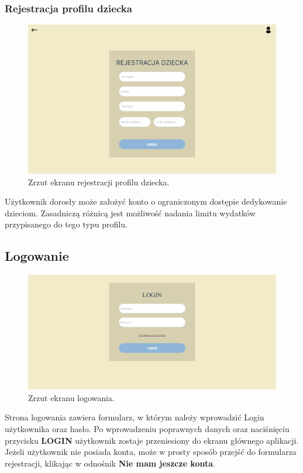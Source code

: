 \documentclass[12pt,a4paper,oneside]{article}
\begin{document}
\subsubsection{Rejestracja profilu dziecka}
\begin{figure}[H]
    \centering
    \includegraphics[width=\hsize,keepaspectratio]{images/register_childs_profile.png}
    \caption{Zrzut ekranu rejestracji profilu dziecka.}
\end{figure}
Użytkownik dorosły może założyć konto o ograniczonym dostępie dedykowanie
dzieciom. Zasadniczą różnicą jest możliwość nadania limitu wydatków przypisanego
do tego typu profilu.

\subsection{Logowanie}
\begin{figure}[H]
    \centering
    \includegraphics[width=\hsize,keepaspectratio]{images/login.png}
    \caption{Zrzut ekranu logowania.}
\end{figure}
Strona logowania zawiera formularz, w którym należy wprowadzić Login użytkownika
oraz hasło. Po wprowadzeniu poprawnych danych oraz naciśnięciu przycisku
\textbf{LOGIN} użytkownik zostaje przeniesiony do ekranu głównego aplikacji.
Jeżeli użytkownik nie posiada konta, może w prosty sposób przejść do formularza
rejestracji, klikając w odnośnik \textbf{Nie mam jeszcze konta}.
\end{document}
